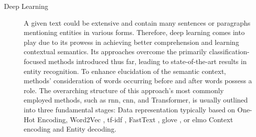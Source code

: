 \begin{description}
    \item[Deep Learning] A given text could be extensive and contain many sentences or paragraphs mentioning entities in various forms. Therefore, deep learning comes into play due to its prowess in achieving better comprehension and learning contextual semantics. Its approaches overcome the primarily classification-focused methods introduced thus far, leading to state-of-the-art results in entity recognition. To enhance elucidation of the semantic context, methods' consideration of words occurring before and after words possess a role. The overarching structure of this approach's most commonly employed methods, such as \acrfull{rnn}, \acrfull{cnn}, and Transformer, is usually outlined into three fundamental stages: Data representation typically based on One-Hot Encoding, Word2Vec \parencite{mikolov2013word2vec}, \acrfull{tf-idf} \parencite{AIZAWA200345tfidf}, FastText \parencite{joulin2016bagfasttext}, \acrfull{glove} \parencite{pennington-etal-2014-glove}, or \acrfull{elmo} \parencite{peters2018elmo}Context encoding and Entity decoding.
\end{description}

